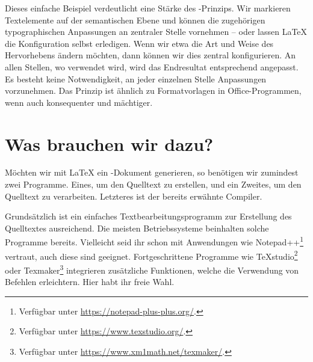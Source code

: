Dieses einfache Beispiel verdeutlicht eine Stärke des -Prinzips. 
Wir markieren Textelemente auf der semantischen Ebene und können die zugehörigen typographischen Anpassungen an zentraler Stelle vornehmen -- oder lassen \LaTeX{} die Konfiguration selbst erledigen.
Wenn wir etwa die Art und Weise des Hervorhebens ändern möchten, dann können wir dies zentral konfigurieren. An allen Stellen, wo \texttt{\emph{}} verwendet wird, wird das Endresultat entsprechend angepasst. Es besteht keine Notwendigkeit, an jeder einzelnen Stelle Anpassungen vorzunehmen. Das Prinzip ist ähnlich zu Formatvorlagen in Office-Programmen, wenn auch konsequenter und mächtiger. 


\section{Was brauchen wir dazu?}
\label{subsec:what-we-need}

Möchten wir mit \LaTeX{} ein -Dokument generieren, so benötigen wir zumindest zwei Programme. Eines, um den Quelltext zu erstellen, und ein Zweites, um den Quelltext zu verarbeiten. Letzteres ist der bereits erwähnte Compiler.

Grundsätzlich ist ein einfaches Textbearbeitungsprogramm zur Erstellung des Quelltextes ausreichend. Die meisten Betriebssysteme beinhalten solche Programme bereits. Vielleicht seid ihr schon mit Anwendungen wie Notepad++\footnote{Verfügbar unter \url{https://notepad-plus-plus.org/}.} vertraut, auch diese sind geeignet.
Fortgeschrittene Programme wie TeXstudio\footnote{Verfügbar unter \url{https://www.texstudio.org/}.} oder Texmaker\footnote{Verfügbar unter \url{https://www.xm1math.net/texmaker/}.} integrieren zusätzliche Funktionen, welche die Verwendung von Befehlen erleichtern. Hier habt ihr freie Wahl.

